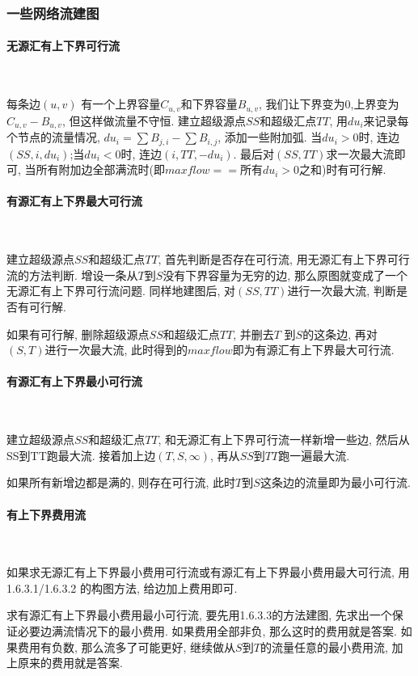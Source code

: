 	\subsubsection{一些网络流建图}
	\paragraph{无源汇有上下界可行流}\
	\par 每条边$(u,v)$ 有一个上界容量$C_{u,v}$和下界容量$B_{u,v}$, 我们让下界变为$0$,上界变为$C_{u,v}-B_{u,v}$, 但这样做流量不守恒. 建立超级源点$SS$和超级汇点$TT$, 用$du_i$来记录每个节点的流量情况, $du_i=\sum B_{j,i}-\sum B_{i,j}$, 添加一些附加弧. 当$du_i>0$时, 连边$(SS,i,du_i)$;当$du_i<0$时, 连边$(i,TT,-du_i)$. 最后对$(SS,TT)$求一次最大流即可, 当所有附加边全部满流时(即$maxflow==所有du_i>0之和$)时有可行解. 
	\paragraph{有源汇有上下界最大可行流}\
	\par 建立超级源点$SS$和超级汇点$TT$, 首先判断是否存在可行流, 用无源汇有上下界可行流的方法判断. 增设一条从$T$到$S$没有下界容量为无穷的边, 那么原图就变成了一个无源汇有上下界可行流问题. 同样地建图后, 对$(SS,TT)$进行一次最大流, 判断是否有可行解. 
	\par 如果有可行解, 删除超级源点$SS$和超级汇点$TT$, 并删去$T$ 到$S$的这条边, 再对$(S,T)$进行一次最大流, 此时得到的$maxflow$即为有源汇有上下界最大可行流. 
	\paragraph{有源汇有上下界最小可行流}\
	\par 建立超级源点$SS$和超级汇点$TT$, 和无源汇有上下界可行流一样新增一些边, 然后从SS到TT跑最大流. 接着加上边$(T,S,\infty)$, 再从$SS$到$TT$跑一遍最大流. 
	\par 如果所有新增边都是满的, 则存在可行流, 此时$T$到$S$这条边的流量即为最小可行流. 
	\paragraph{有上下界费用流}\
	\par 如果求无源汇有上下界最小费用可行流或有源汇有上下界最小费用最大可行流, 用1.6.3.1/1.6.3.2 的构图方法, 给边加上费用即可. 
	\par 求有源汇有上下界最小费用最小可行流, 要先用1.6.3.3的方法建图, 先求出一个保证必要边满流情况下的最小费用. 如果费用全部非负, 那么这时的费用就是答案. 如果费用有负数, 那么流多了可能更好, 继续做从$S$到$T$的流量任意的最小费用流, 加上原来的费用就是答案. 
